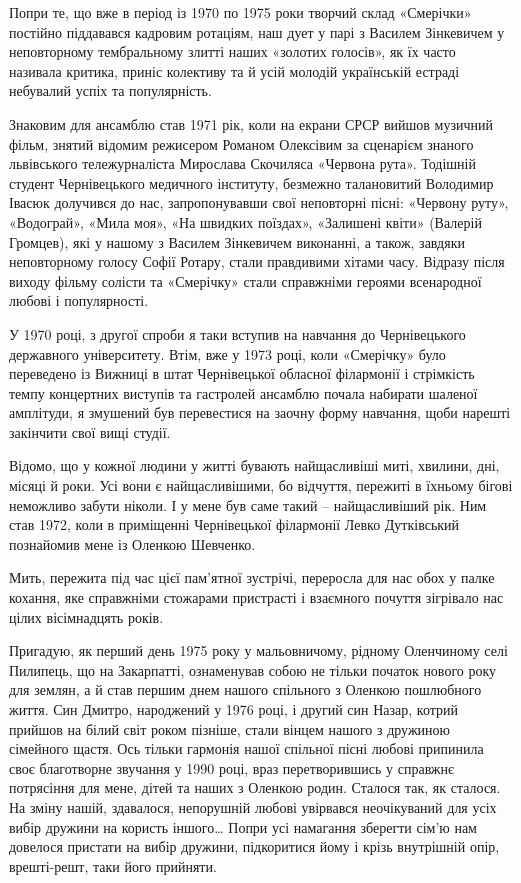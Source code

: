 Попри те, що вже в період із 1970 по 1975 роки творчий склад «Смерічки»
постійно піддавався кадровим ротаціям, наш дует у парі з Василем Зінкевичем у
неповторному тембральному злитті наших «золотих голосів», як їх часто називала
критика, приніс колективу та й усій молодій українській естраді небувалий успіх
та популярність. 

Знаковим для ансамблю став 1971 рік, коли на екрани СРСР вийшов музичний фільм,
знятий відомим режисером Романом Олексівим за сценарієм знаного львівського
тележурналіста Мирослава Скочиляса «Червона рута». Тодішній студент
Чернівецького медичного інституту, безмежно талановитий Володимир Івасюк
долучився до нас, запропонувавши свої неповторні пісні: «Червону руту»,
«Водограй», «Мила моя», «На швидких поїздах», «Залишені квіти» (Валерій
Громцев), які у нашому з Василем Зінкевичем виконанні, а також, завдяки
неповторному голосу Софії Ротару, стали правдивими хітами часу. Відразу після
виходу фільму солісти та «Смерічку» стали справжніми героями всенародної любові
і популярності.

У 1970 році, з другої спроби я таки вступив на навчання до Чернівецького
державного університету. Втім, вже у 1973 році, коли «Смерічку» було переведено
із Вижниці в штат Чернівецької обласної філармонії і стрімкість темпу
концертних виступів та гастролей ансамблю почала набирати шаленої амплітуди, я
змушений був перевестися на заочну форму навчання, щоби нарешті закінчити свої
вищі студії.

Відомо, що у кожної людини у житті бувають найщасливіші миті, хвилини, дні,
місяці й роки. Усі вони є найщасливішими, бо відчуття, пережиті в їхньому
бігові неможливо забути ніколи. І у мене був саме такий – найщасливіший рік.
Ним став 1972, коли в приміщенні Чернівецької філармонії Левко Дутківський
познайомив мене із Оленкою Шевченко. 

Мить, пережита під час цієї пам’ятної зустрічі, переросла для нас обох у палке
кохання, яке справжніми стожарами пристрасті і взаємного почуття зігрівало нас
цілих вісімнадцять років. 

Пригадую, як перший день 1975 року у мальовничому, рідному Оленчиному селі
Пилипець, що на Закарпатті, ознаменував собою не тільки початок нового року для
землян, а й став першим днем нашого спільного з Оленкою пошлюбного життя. Син
Дмитро, народжений у 1976 році, і другий син Назар, котрий прийшов на білий
світ роком пізніше, стали вінцем нашого з дружиною сімейного щастя. Ось тільки
гармонія нашої спільної пісні любові припинила своє благотворне звучання у 1990
році, враз перетворившись у справжнє потрясіння для мене, дітей та наших з
Оленкою родин. Сталося так, як сталося. На зміну нашій, здавалося, непорушній
любові увірвався неочікуваний для усіх вибір дружини на користь іншого… Попри
усі намагання зберегти сім’ю нам довелося пристати на вибір дружини,
підкоритися йому і крізь внутрішній опір, врешті-решт, таки його прийняти.   

